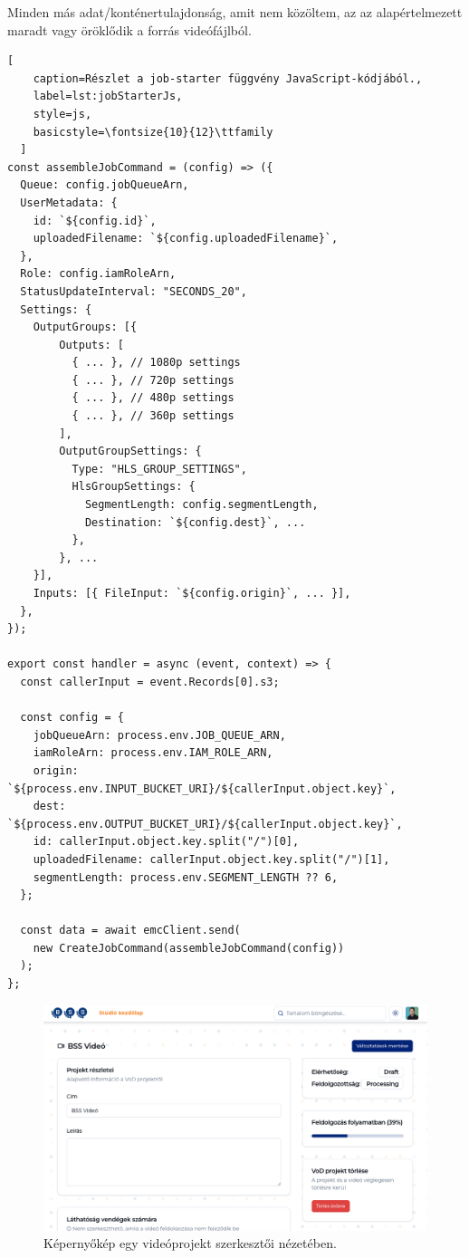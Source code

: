 Minden más adat/konténertulajdonság, amit nem közöltem, az az alapértelmezett maradt vagy öröklődik a forrás videófájlból.

\begin{minipage}{0.92\textwidth}
  \begin{lstlisting}[
    caption=Részlet a job-starter függvény JavaScript-kódjából.,
    label=lst:jobStarterJs,
    style=js,
    basicstyle=\fontsize{10}{12}\ttfamily
  ]
const assembleJobCommand = (config) => ({
  Queue: config.jobQueueArn,
  UserMetadata: {
    id: `${config.id}`,
    uploadedFilename: `${config.uploadedFilename}`,
  },
  Role: config.iamRoleArn,
  StatusUpdateInterval: "SECONDS_20",
  Settings: {
    OutputGroups: [{
        Outputs: [
          { ... }, // 1080p settings
          { ... }, // 720p settings
          { ... }, // 480p settings
          { ... }, // 360p settings
        ],
        OutputGroupSettings: {
          Type: "HLS_GROUP_SETTINGS",
          HlsGroupSettings: {
            SegmentLength: config.segmentLength, 
            Destination: `${config.dest}`, ...
          },
        }, ...
    }],
    Inputs: [{ FileInput: `${config.origin}`, ... }],
  },
});

export const handler = async (event, context) => {
  const callerInput = event.Records[0].s3;

  const config = {
    jobQueueArn: process.env.JOB_QUEUE_ARN,
    iamRoleArn: process.env.IAM_ROLE_ARN,
    origin: `${process.env.INPUT_BUCKET_URI}/${callerInput.object.key}`,
    dest: `${process.env.OUTPUT_BUCKET_URI}/${callerInput.object.key}`,
    id: callerInput.object.key.split("/")[0],
    uploadedFilename: callerInput.object.key.split("/")[1],
    segmentLength: process.env.SEGMENT_LENGTH ?? 6,
  };

  const data = await emcClient.send(
    new CreateJobCommand(assembleJobCommand(config))
  );
};
\end{lstlisting}
\end{minipage}

\begin{figure}
  \centering
  \includegraphics[width=150mm, keepaspectratio]{figures/processing.png}
  \caption{Képernyőkép egy videóprojekt szerkesztői nézetében.}
  \label{fig:processing}
\end{figure}

